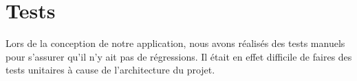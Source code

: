 \section{Tests}
Lors de la conception de notre application, nous avons réalisés des tests manuels pour s'assurer qu'il n'y ait pas de régressions.
Il était en effet difficile de faires des tests unitaires à cause de l'architecture du projet.